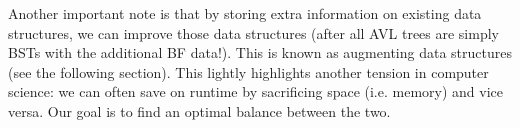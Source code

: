 Another important note is that by storing extra information on existing data structures, we can improve those data structures (after all AVL trees are simply BSTs with the additional BF data!). This is known as augmenting data structures (see the following section). This lightly highlights another tension in computer science: we can often save on runtime by sacrificing space (i.e. memory) and vice versa. Our goal is to find an optimal balance between the two.